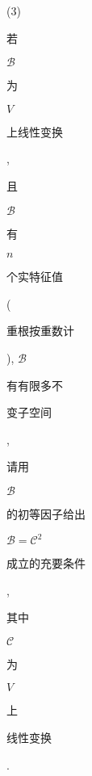\documentclass[10pt]{article}
\begin{document}
(3) \begin{CJK}{UTF8}{mj}若\end{CJK} $\mathscr{B}$ \begin{CJK}{UTF8}{mj}为\end{CJK} $V$ \begin{CJK}{UTF8}{mj}上线性变换\end{CJK}, \begin{CJK}{UTF8}{mj}且\end{CJK} $\mathscr{B}$ \begin{CJK}{UTF8}{mj}有\end{CJK} $n$ \begin{CJK}{UTF8}{mj}个实特征值\end{CJK} (\begin{CJK}{UTF8}{mj}重根按重数计\end{CJK}), $\mathscr{B}$ \begin{CJK}{UTF8}{mj}有有限多不\end{CJK} \begin{CJK}{UTF8}{mj}变子空间\end{CJK}, \begin{CJK}{UTF8}{mj}请用\end{CJK} $\mathscr{B}$ \begin{CJK}{UTF8}{mj}的初等因子给出\end{CJK} $\mathscr{B}=\mathscr{C}^{2}$ \begin{CJK}{UTF8}{mj}成立的充要条件\end{CJK}, \begin{CJK}{UTF8}{mj}其中\end{CJK} $\mathscr{C}$ \begin{CJK}{UTF8}{mj}为\end{CJK} $V$ \begin{CJK}{UTF8}{mj}上\end{CJK} \begin{CJK}{UTF8}{mj}线性变换\end{CJK}.
\end{document}
